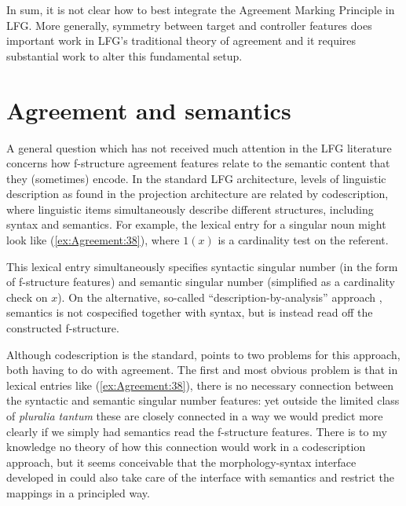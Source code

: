 \documentclass[output=paper,hidelinks]{langscibook}
\begin{document}
In sum, it is not clear how to best integrate the Agreement Marking
Principle in LFG. More generally, symmetry between target and
controller features does important work in LFG's traditional theory of agreement
and it requires substantial work to alter this fundamental setup.


\section{Agreement and semantics}
A general question which has not received much attention in the LFG
literature concerns how f-structure agreement features relate to the
semantic content that they (sometimes) encode. In the standard LFG
architecture, levels of linguistic description as found in the
projection architecture are related by codescription, where
linguistic items simultaneously describe different structures,
including syntax and semantics. For example, the lexical entry for a
singular noun might look like (\ref{ex:Agreement:38}), where $1(x)$ is a cardinality
test on the referent.


\ea\label{ex:Agreement:38}
\z
This lexical entry simultaneously specifies syntactic singular number
(in the form of f-structure features) and semantic singular number
(simplified as a cardinality check on $x$). On the alternative, so-called
“description-by-analysis” approach \citep{halvorsen83}, semantics is
not cospecified together with syntax, but is instead read off the
constructed f-structure.

Although codescription is the standard, \citet{andrews2008} points to
two problems for this approach, both having to do with agreement. The
first and most obvious problem is that in lexical entries like (\ref{ex:Agreement:38}),
there is no necessary connection between the syntactic and semantic
singular number features: yet outside the limited class of
\textit{pluralia tantum} these are closely connected in a way we would
predict more clearly if we simply had semantics read the f-structure
features. There is to my knowledge no theory of how this connection
would work in a codescription approach, but it seems conceivable that
the morphology-syntax interface developed in \textcite[Chapter
  12]{DLM:LFG} could also take care of the interface
with semantics and restrict the mappings in a principled way.
\end{document}
